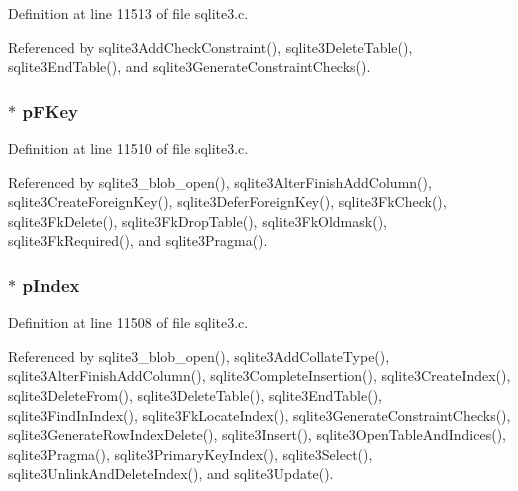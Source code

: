 Definition at line 11513 of file sqlite3.\+c.



Referenced by sqlite3\+Add\+Check\+Constraint(), sqlite3\+Delete\+Table(), sqlite3\+End\+Table(), and sqlite3\+Generate\+Constraint\+Checks().

\hypertarget{struct_table_a391d064a091c847c4126539c4e5dc2a8}{}
\subsubsection[{p\+F\+Key}]{$\ast$ p\+F\+Key}\label{struct_table_a391d064a091c847c4126539c4e5dc2a8}


Definition at line 11510 of file sqlite3.\+c.



Referenced by sqlite3\+\_\+blob\+\_\+open(), sqlite3\+Alter\+Finish\+Add\+Column(), sqlite3\+Create\+Foreign\+Key(), sqlite3\+Defer\+Foreign\+Key(), sqlite3\+Fk\+Check(), sqlite3\+Fk\+Delete(), sqlite3\+Fk\+Drop\+Table(), sqlite3\+Fk\+Oldmask(), sqlite3\+Fk\+Required(), and sqlite3\+Pragma().

\hypertarget{struct_table_a2bf7196ac1f39bd4b9dc95c3a9e9a68e}{}
\subsubsection[{p\+Index}]{$\ast$ p\+Index}\label{struct_table_a2bf7196ac1f39bd4b9dc95c3a9e9a68e}


Definition at line 11508 of file sqlite3.\+c.



Referenced by sqlite3\+\_\+blob\+\_\+open(), sqlite3\+Add\+Collate\+Type(), sqlite3\+Alter\+Finish\+Add\+Column(), sqlite3\+Complete\+Insertion(), sqlite3\+Create\+Index(), sqlite3\+Delete\+From(), sqlite3\+Delete\+Table(), sqlite3\+End\+Table(), sqlite3\+Find\+In\+Index(), sqlite3\+Fk\+Locate\+Index(), sqlite3\+Generate\+Constraint\+Checks(), sqlite3\+Generate\+Row\+Index\+Delete(), sqlite3\+Insert(), sqlite3\+Open\+Table\+And\+Indices(), sqlite3\+Pragma(), sqlite3\+Primary\+Key\+Index(), sqlite3\+Select(), sqlite3\+Unlink\+And\+Delete\+Index(), and sqlite3\+Update().

\hypertarget{struct_table_a2c75a77cbf15e71f861a82754851142f}{}
